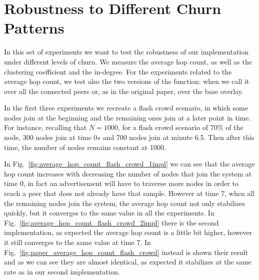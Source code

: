 \section{Robustness to Different Churn Patterns}
\label{sec:robustness}
In this set of experiments we want to test the robustness of our implementation under different levels of churn. We measure the average hop count, as well as the clustering coefficient and the in-degree. For the experiments related to the average hop count, we test also the two versions of the \getMetropolisHastingsNeighbour function: when we call it over all the connected peers or, as in the original paper, over the base overlay.

In the first three experiments we recreate a flash crowd scenario, in which some nodes join at the beginning and the remaining ones join at a later point in time. For instance, recalling that $N = 1000$, for a flash crowd scenario of 70\% of the node, 300 nodes join at time $0s$ and 700 nodes join at minute 6.5. Then after this time, the number of nodes remains constant at 1000. 

In Fig.~\ref{fig:average_hop_count_flash_crowd_1impl} we can see that the average hop count increases with decreasing the number of nodes that join the system at time 0, in fact an advertisement will have to traverse more nodes in order to reach a peer that does not already have that sample. However at time 7, when all the remaining nodes join the system, the average hop count not only stabilizes quickly, but it converges to the same value in all the experiments. In Fig.~\ref{fig:average_hop_count_flash_crowd_2impl} there is the second implementation, as expected the average hop count is a little bit higher, however it still converges to the same value at time 7. In Fig.~\ref{fig:paper_average_hop_count_flash_crowd} instead is shown their result and as we can see they are almost identical, as expected it stabilizes at the same rate as in our second implementation. 

